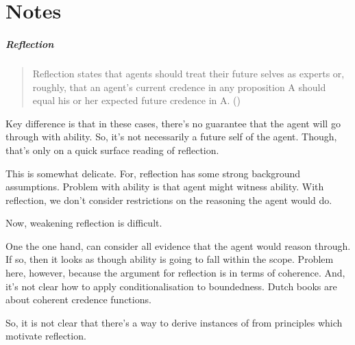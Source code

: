 \chapter{Notes}
\label{cha:notes}

\paragraph{Reflection}

\begin{note}[Reflection]
  \begin{quote}
    Reflection states that agents should treat their future selves as experts or, roughly, that an agent’s current credence in any proposition A should equal his or her expected future credence in A.\linebreak
    \mbox{}\hfill\mbox{(\Citeyear[59]{Briggs:2009up})}
  \end{quote}
\end{note}

\begin{note}
  Key difference is that in these cases, there's no guarantee that the agent will go through with ability.
  So, it's not necessarily a future self of the agent.
  Though, that's only on a quick surface reading of reflection.

  This is somewhat delicate.
  For, reflection has some strong background assumptions.
  Problem with ability is that agent might witness ability.
  With reflection, we don't consider restrictions on the reasoning the agent would do.

  Now, weakening reflection is difficult.

  One the one hand, can consider all evidence that the agent would reason through.
  If so, then it looks as though ability is going to fall within the scope.
  Problem here, however, because the argument for reflection is in terms of coherence.
  And, it's not clear how to apply conditionalisation to boundedness.
  Dutch books are about coherent credence functions.

  So, it is not clear that there's a way to derive instances of  from principles which motivate reflection.
\end{note}

